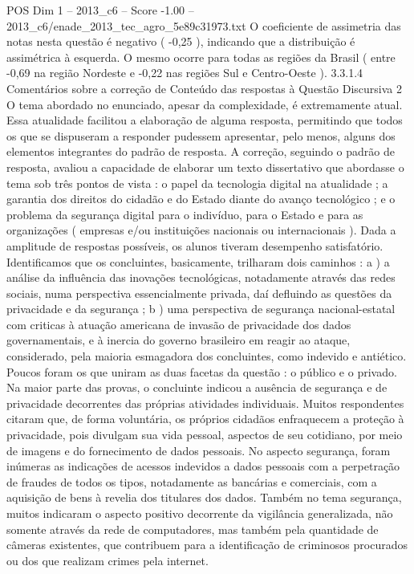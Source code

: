\begin{textsample}{POS Dim 1 – 2013\_c6 – Score -1.00 – 2013\_c6/enade\_2013\_tec\_agro\_5e89c31973.txt}
O coeficiente de assimetria das notas nesta questão é negativo ( -0,25 ), indicando que a distribuição é assimétrica à esquerda.
O mesmo ocorre para todas as regiões da Brasil ( entre -0,69 na região Nordeste e -0,22 nas regiões Sul e Centro-Oeste ). 3.3.1.4 Comentários sobre a correção de Conteúdo das respostas à Questão Discursiva 2 O tema abordado no enunciado, apesar da complexidade, é extremamente atual.
Essa atualidade facilitou a elaboração de alguma resposta, permitindo que todos os que se dispuseram a responder pudessem apresentar, pelo menos, alguns dos elementos integrantes do padrão de resposta.
A correção, seguindo o padrão de resposta, avaliou a capacidade de elaborar um texto dissertativo que abordasse o tema sob três pontos de vista : o papel da tecnologia digital na atualidade ; a garantia dos direitos do cidadão e do Estado diante do avanço tecnológico ; e o problema da segurança digital para o indivíduo, para o Estado e para as organizações ( empresas e/ou instituições nacionais ou internacionais ).
Dada a amplitude de respostas possíveis, os alunos tiveram desempenho satisfatório.
Identificamos que os concluintes, basicamente, trilharam dois caminhos : a ) a análise da influência das inovações tecnológicas, notadamente através das redes sociais, numa perspectiva essencialmente privada, daí defluindo as questões da privacidade e da segurança ; b ) uma perspectiva de segurança nacional-estatal com criticas à atuação americana de invasão de privacidade dos dados governamentais, e à inercia do governo brasileiro em reagir ao ataque, considerado, pela maioria esmagadora dos concluintes, como indevido e antiético.
Poucos foram os que uniram as duas facetas da questão : o público e o privado.
Na maior parte das provas, o concluinte indicou a ausência de segurança e de privacidade decorrentes das próprias atividades individuais.
Muitos respondentes citaram que, de forma voluntária, os próprios cidadãos enfraquecem a proteção à privacidade, pois divulgam sua vida pessoal, aspectos de seu cotidiano, por meio de imagens e do fornecimento de dados pessoais.
No aspecto segurança, foram inúmeras as indicações de acessos indevidos a dados pessoais com a perpetração de fraudes de todos os tipos, notadamente as bancárias e comerciais, com a aquisição de bens à revelia dos titulares dos dados.
Também no tema segurança, muitos indicaram o aspecto positivo decorrente da vigilância generalizada, não somente através da rede de computadores, mas também pela quantidade de câmeras existentes, que contribuem para a identificação de criminosos procurados ou dos que realizam crimes pela internet.

\end{textsample}
